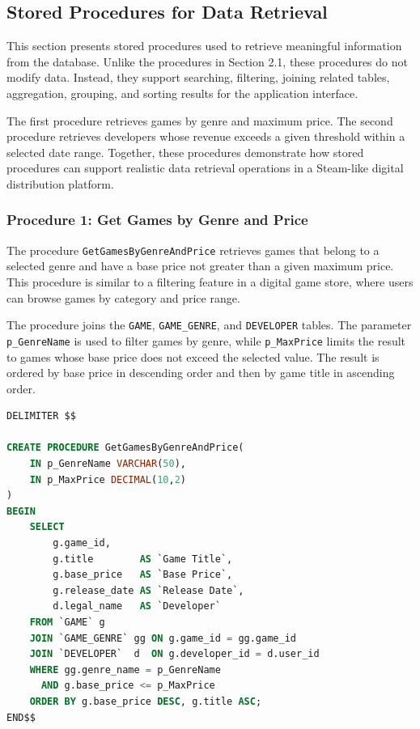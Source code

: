 \subsection{Stored Procedures for Data Retrieval}

This section presents stored procedures used to retrieve meaningful information from the database. 
Unlike the procedures in Section 2.1, these procedures do not modify data. 
Instead, they support searching, filtering, joining related tables, aggregation, grouping, and sorting results for the application interface.

The first procedure retrieves games by genre and maximum price. 
The second procedure retrieves developers whose revenue exceeds a given threshold within a selected date range. 
Together, these procedures demonstrate how stored procedures can support realistic data retrieval operations in a Steam-like digital distribution platform.
\subsubsection{Procedure 1: Get Games by Genre and Price}

The procedure \texttt{GetGamesByGenreAndPrice} retrieves games that belong to a selected genre and have a base price not greater than a given maximum price. 
This procedure is similar to a filtering feature in a digital game store, where users can browse games by category and price range.

The procedure joins the \texttt{GAME}, \texttt{GAME\_GENRE}, and \texttt{DEVELOPER} tables. 
The parameter \texttt{p\_GenreName} is used to filter games by genre, while \texttt{p\_MaxPrice} limits the result to games whose base price does not exceed the selected value. 
The result is ordered by base price in descending order and then by game title in ascending order.

\begin{lstlisting}[language=SQL, caption={Procedure for retrieving games by genre and maximum price (column aliases shown in English; the actual SQL file in \texttt{SQLData/Procedure1.sql} uses Vietnamese aliases for end-user display)}, label={lst:get-games-by-genre-price}]
DELIMITER $$

CREATE PROCEDURE GetGamesByGenreAndPrice(
    IN p_GenreName VARCHAR(50),
    IN p_MaxPrice DECIMAL(10,2)
)
BEGIN
    SELECT
        g.game_id,
        g.title        AS `Game Title`,
        g.base_price   AS `Base Price`,
        g.release_date AS `Release Date`,
        d.legal_name   AS `Developer`
    FROM `GAME` g
    JOIN `GAME_GENRE` gg ON g.game_id = gg.game_id
    JOIN `DEVELOPER`  d  ON g.developer_id = d.user_id
    WHERE gg.genre_name = p_GenreName
      AND g.base_price <= p_MaxPrice
    ORDER BY g.base_price DESC, g.title ASC;
END$$
\end{lstlisting}
